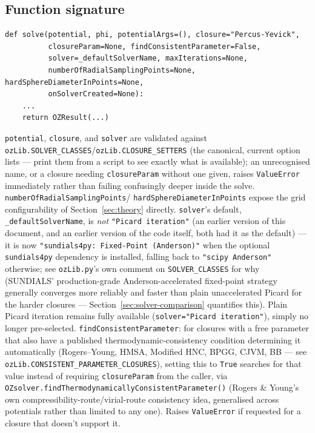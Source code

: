 \documentclass[11pt,a4paper]{article}
\newcommand{\code}[1]{\texttt{#1}}
\begin{document}
\subsection{Function signature}
\begin{lstlisting}
def solve(potential, phi, potentialArgs=(), closure="Percus-Yevick",
          closureParam=None, findConsistentParameter=False,
          solver=_defaultSolverName, maxIterations=None,
          numberOfRadialSamplingPoints=None, hardSphereDiameterInPoints=None,
          onSolverCreated=None):
    ...
    return OZResult(...)
\end{lstlisting}
\code{potential}, \code{closure}, and \code{solver} are validated against
\code{ozLib.SOLVER\_CLASSES}/\code{ozLib.CLOSURE\_SETTERS} (the canonical,
current option lists --- print them from a script to see exactly what is
available); an unrecognised name, or a closure needing \code{closureParam}
without one given, raises \code{ValueError} immediately rather than failing
confusingly deeper inside the solve. \code{numberOfRadialSamplingPoints}/
\code{hardSphereDiameterInPoints} expose the grid configurability of
Section~\ref{sec:theory} directly. \code{solver}'s default,
\code{\_defaultSolverName}, is \emph{not} \code{"Picard iteration"} (an earlier
version of this document, and an earlier version of the code itself, both had
it as the default) --- it is now \code{"sundials4py: Fixed-Point (Anderson)"}
when the optional \code{sundials4py} dependency is installed, falling back to
\code{"scipy Anderson"} otherwise; see \code{ozLib.py}'s own comment on
\code{SOLVER\_CLASSES} for why (SUNDIALS' production-grade Anderson-accelerated
fixed-point strategy generally converges more reliably and faster than plain
unaccelerated Picard for the harder closures --- Section~\ref{sec:solver-comparison}
quantifies this). Plain Picard iteration remains fully available
(\code{solver="Picard iteration"}), simply no longer pre-selected.
\code{findConsistentParameter}: for closures with a free parameter that also
have a published thermodynamic-consistency condition determining it
automatically (Rogers--Young, HMSA, Modified HNC, BPGG, CJVM, BB --- see
\code{ozLib.CONSISTENT\_PARAMETER\_CLOSURES}), setting this to \code{True}
searches for that value instead of requiring \code{closureParam} from the
caller, via \code{OZsolver.findThermodynamicallyConsistentParameter()}
(Rogers \& Young's own compressibility-route/virial-route consistency idea,
generalised across potentials rather than limited to any one). Raises
\code{ValueError} if requested for a closure that doesn't support it.
\end{document}
